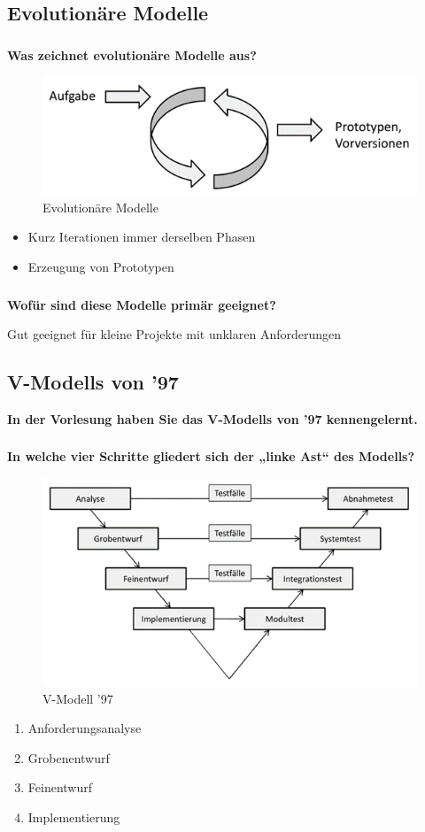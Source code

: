 \subsection{Evolutionäre Modelle}
\subsubsection{}
\textbf{Was zeichnet evolutionäre Modelle aus? }
\begin{figure}[H]
    \centering
    \includegraphics[width=.5\linewidth]{Graphics/Evolutional_Model.png}
    \caption{Evolutionäre Modelle}
\end{figure}
\begin{itemize}
    \item Kurz Iterationen immer derselben Phasen
    \item Erzeugung von Prototypen
\end{itemize}

\subsubsection{}
\textbf{Wofür sind diese Modelle primär geeignet?}

Gut geeignet für kleine Projekte mit unklaren Anforderungen

\subsection{V-Modells von ’97}
\textbf{In der Vorlesung haben Sie das V-Modells von ’97 kennengelernt.}
\subsubsection{}
\textbf{In welche vier Schritte gliedert sich der „linke Ast“ des Modells?}
\begin{figure}[H]
    \centering
    \includegraphics[width=.6\linewidth]{Graphics/V_Modell_97.png}
    \caption{V-Modell '97}
\end{figure}
\begin{enumerate}
    \item Anforderungsanalyse
    \item Grobenentwurf
    \item Feinentwurf
    \item Implementierung
\end{enumerate}
